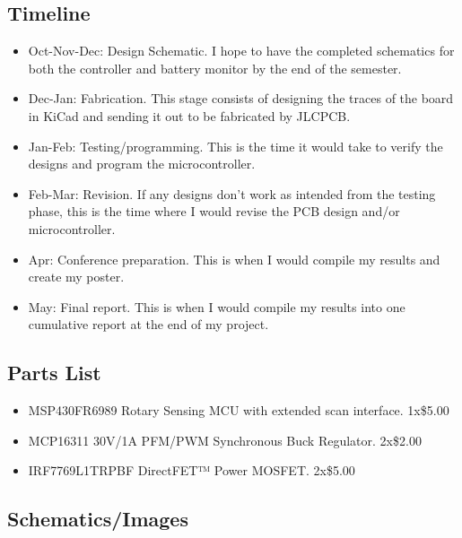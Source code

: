 \documentclass[conference]{IEEEtran}
\begin{document}
\subsection{Timeline}

\begin{itemize}
    \item Oct-Nov-Dec: Design Schematic. I hope to have the completed schematics for both the controller and battery monitor by the end of the semester. 
    \item Dec-Jan: Fabrication. This stage consists of designing the traces of the board in KiCad and sending it out to be fabricated by JLCPCB.
    \item Jan-Feb: Testing/programming. This is the time it would take to verify the designs and program the microcontroller.
    \item Feb-Mar: Revision. If any designs don't work as intended from the testing phase, this is the time where I would revise the PCB design and/or microcontroller.
    \item Apr: Conference preparation. This is when I would compile my results and create my poster.
    \item May: Final report. This is when I would compile my results into one cumulative report at the end of my project.
\end{itemize}

\subsection{Parts List}

\begin{itemize}
    \item MSP430FR6989 Rotary Sensing MCU with extended scan interface. 1x\$5.00
    \item MCP16311 30V/1A PFM/PWM Synchronous Buck Regulator. 2x\$2.00
    \item IRF7769L1TRPBF DirectFET™ Power MOSFET. 2x\$5.00
\end{itemize}

\subsection{Schematics/Images}
\end{document}
